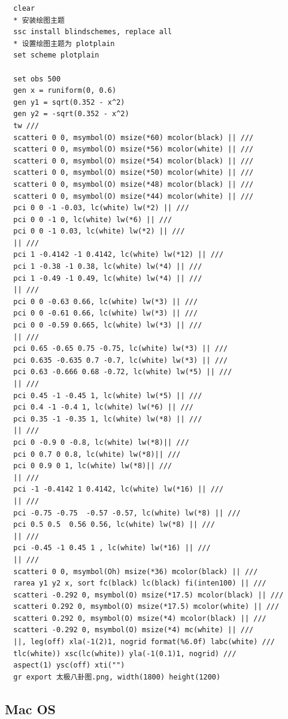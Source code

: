 \documentclass[cn,fancy,blue,11pt]{elegantbook}
\begin{document}
\begin{lstlisting}
  clear
  * 安装绘图主题
  ssc install blindschemes, replace all
  * 设置绘图主题为 plotplain
  set scheme plotplain

  set obs 500
  gen x = runiform(0, 0.6)
  gen y1 = sqrt(0.352 - x^2)
  gen y2 = -sqrt(0.352 - x^2)
  tw ///
  scatteri 0 0, msymbol(O) msize(*60) mcolor(black) || ///
  scatteri 0 0, msymbol(O) msize(*56) mcolor(white) || ///
  scatteri 0 0, msymbol(O) msize(*54) mcolor(black) || ///
  scatteri 0 0, msymbol(O) msize(*50) mcolor(white) || ///
  scatteri 0 0, msymbol(O) msize(*48) mcolor(black) || ///
  scatteri 0 0, msymbol(O) msize(*44) mcolor(white) || ///
  pci 0 0 -1 -0.03, lc(white) lw(*2) || ///
  pci 0 0 -1 0, lc(white) lw(*6) || ///
  pci 0 0 -1 0.03, lc(white) lw(*2) || ///
  || ///
  pci 1 -0.4142 -1 0.4142, lc(white) lw(*12) || ///
  pci 1 -0.38 -1 0.38, lc(white) lw(*4) || ///
  pci 1 -0.49 -1 0.49, lc(white) lw(*4) || ///
  || ///
  pci 0 0 -0.63 0.66, lc(white) lw(*3) || ///
  pci 0 0 -0.61 0.66, lc(white) lw(*3) || ///
  pci 0 0 -0.59 0.665, lc(white) lw(*3) || ///
  || ///
  pci 0.65 -0.65 0.75 -0.75, lc(white) lw(*3) || ///
  pci 0.635 -0.635 0.7 -0.7, lc(white) lw(*3) || ///
  pci 0.63 -0.666 0.68 -0.72, lc(white) lw(*5) || ///
  || ///
  pci 0.45 -1 -0.45 1, lc(white) lw(*5) || ///
  pci 0.4 -1 -0.4 1, lc(white) lw(*6) || ///
  pci 0.35 -1 -0.35 1, lc(white) lw(*8) || ///
  || ///
  pci 0 -0.9 0 -0.8, lc(white) lw(*8)|| ///
  pci 0 0.7 0 0.8, lc(white) lw(*8)|| ///
  pci 0 0.9 0 1, lc(white) lw(*8)|| ///
  || ///
  pci -1 -0.4142 1 0.4142, lc(white) lw(*16) || ///
  || ///
  pci -0.75 -0.75  -0.57 -0.57, lc(white) lw(*8) || ///
  pci 0.5 0.5  0.56 0.56, lc(white) lw(*8) || ///
  || ///
  pci -0.45 -1 0.45 1 , lc(white) lw(*16) || ///
  || ///
  scatteri 0 0, msymbol(Oh) msize(*36) mcolor(black) || ///
  rarea y1 y2 x, sort fc(black) lc(black) fi(inten100) || ///
  scatteri -0.292 0, msymbol(O) msize(*17.5) mcolor(black) || ///
  scatteri 0.292 0, msymbol(O) msize(*17.5) mcolor(white) || ///
  scatteri 0.292 0, msymbol(O) msize(*4) mcolor(black) || ///
  scatteri -0.292 0, msymbol(O) msize(*4) mc(white) || ///
  ||, leg(off) xla(-1(2)1, nogrid format(%6.0f) labc(white) ///
  tlc(white)) xsc(lc(white)) yla(-1(0.1)1, nogrid) ///
  aspect(1) ysc(off) xti("")
  gr export 太极八卦图.png, width(1800) height(1200)
\end{lstlisting}

\hypertarget{mac-os-2}{%
\subsection{Mac OS}\label{mac-os-2}}
\end{document}
